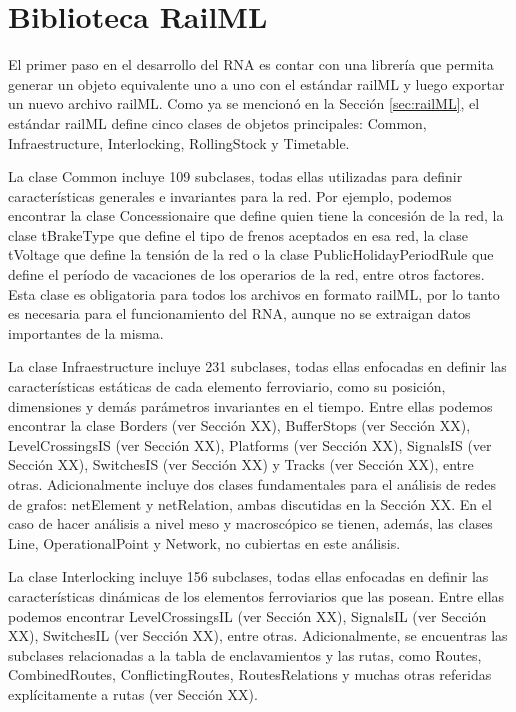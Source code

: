 \section{Biblioteca RailML}

    El primer paso en el desarrollo del RNA es contar con una librería que permita generar un objeto equivalente uno a uno con el estándar railML y luego exportar un nuevo archivo railML. Como ya se mencionó en la Sección \ref{sec:railML}, el estándar railML define cinco clases de objetos principales: Common, Infraestructure, Interlocking, RollingStock y Timetable. 

    La clase Common incluye 109 subclases, todas ellas utilizadas para definir características generales e invariantes para la red. Por ejemplo, podemos encontrar la clase Concessionaire que define quien tiene la concesión de la red, la clase tBrakeType que define el tipo de frenos aceptados en esa red, la clase tVoltage que define la tensión de la red o la clase PublicHolidayPeriodRule que define el período de vacaciones de los operarios de la red, entre otros factores. Esta clase es obligatoria para todos los archivos en formato railML, por lo tanto es necesaria para el funcionamiento del RNA, aunque no se extraigan datos importantes de la misma.

    La clase Infraestructure incluye  231 subclases, todas ellas enfocadas en definir las características estáticas de cada elemento ferroviario, como su posición, dimensiones y demás parámetros invariantes en el tiempo.  Entre ellas podemos encontrar la clase Borders (ver Sección XX), BufferStops (ver Sección XX), LevelCrossingsIS (ver Sección XX), Platforms (ver Sección XX), SignalsIS (ver Sección XX), SwitchesIS (ver Sección XX) y Tracks (ver Sección XX), entre otras. Adicionalmente incluye dos clases fundamentales para el análisis de redes de grafos: netElement y netRelation, ambas discutidas en la Sección XX. En el caso de hacer análisis a nivel meso y macroscópico se tienen, además, las clases Line, OperationalPoint y Network, no cubiertas en este análisis.

    La clase Interlocking incluye 156 subclases, todas ellas enfocadas en definir las características dinámicas de los elementos ferroviarios que las posean. Entre ellas podemos encontrar LevelCrossingsIL (ver Sección XX), SignalsIL (ver Sección XX), SwitchesIL (ver Sección XX), entre otras. Adicionalmente, se encuentras las subclases relacionadas a la tabla de enclavamientos y las rutas, como Routes, CombinedRoutes, ConflictingRoutes, RoutesRelations y muchas otras referidas explícitamente a rutas (ver Sección XX). 
    
